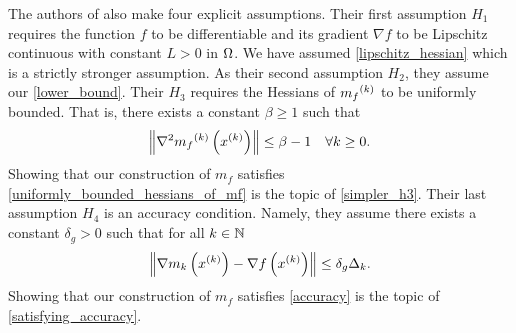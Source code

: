 \documentclass{article}
\begin{document}
The authors of \cite{Conejo:2013:GCT:2620806.2621814} also make four explicit assumptions.
Their first assumption $H_1$ requires the function $f$ to be differentiable and its gradient $\nabla f$ to be Lipschitz continuous with constant $L > 0$ in $\Omega$.
We have assumed \cref{lipschitz_hessian} which is a strictly stronger assumption.
As their second assumption $H_2$, they assume our \cref{lower_bound}.
Their $H_3$ requires the Hessians of ${{m}_f}^{(k)}$ to be uniformly bounded.
That is, there exists a constant $\beta \ge 1$ such that
\begin{align}
\label{uniformly_bounded_hessians_of_mf}
\left\|\nabla^2 {{m}_f}^{(k)}\left(x^{(k)}\right)\right\| \le \beta - 1\quad \forall k \ge 0.
\end{align}
Showing that our construction of $m_f$ satisfies \cref{uniformly_bounded_hessians_of_mf} is the topic of \cref{simpler_h3}.
Their last assumption $H_4$ is an accuracy condition.
Namely, they assume there exists a constant $\delta_g>0$ such that for all $k \in \mathbb N$
\begin{align}
\label{accuracy}
\left\|\nabla m_k\left(x^{(k)}\right) - \nabla f\left(x^{(k)}\right)\right\| \le \delta_g \Delta_k.
\end{align}
Showing that our construction of $m_f$ satisfies \cref{accuracy} is the topic of \cref{satisfying_accuracy}.


%

%
% 
% 
\end{document}
